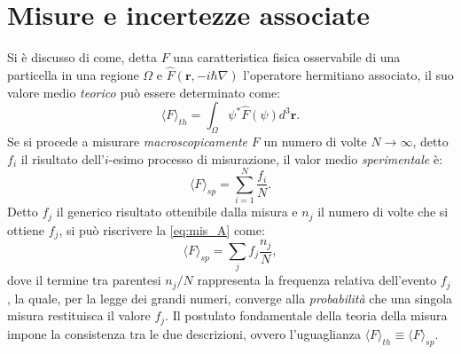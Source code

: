 \documentclass[a4paper,11pt]{report}
\begin{document}
\section{Misure e incertezze associate}
Si è discusso di come, detta $F$ una caratteristica fisica osservabile di una particella in una regione $\Omega$ e $\hat{F}(\bm{r}, -i\hbar \nabla)$ l'operatore hermitiano associato, il suo valore medio \textit{teorico} può essere determinato come:
\begin{equation}
    \langle F \rangle_{th} = \int_\Omega \psi^*\hat{F}(\psi) d^3\bm{r}.
    \label{eq2}
\end{equation}
Se si procede a misurare \textit{macroscopicamente} $F$ un numero di volte $N \to \infty$, detto $f_i$ il risultato dell'$i$-esimo processo di misurazione, il valor medio \textit{sperimentale} è: 
\begin{equation}
    \langle F \rangle_{sp} = \sum_{i = 1}^{N} \frac{f_i}{N}.
    \label{eq:mis_A}
\end{equation}
Detto $f_j$ il generico risultato ottenibile dalla misura e $n_j$ il numero di volte che si ottiene $f_j$, si può riscrivere la \eqref{eq:mis_A} come:
\begin{equation}
    \langle F \rangle_{sp} = \sum_j f_j\frac{n_j}{N},
    \label{eq1}
\end{equation}
dove il termine tra parentesi $n_j/N$ rappresenta la frequenza relativa dell'evento $f_j$, la quale, per la legge dei grandi numeri, converge alla \textit{probabilità} che una singola misura restituisca il valore $f_j$.
Il postulato fondamentale della teoria della misura impone la consistenza tra le due descrizioni, ovvero l'uguaglianza $\langle F \rangle_{th} \equiv \langle F \rangle_{sp}$.
\end{document}
